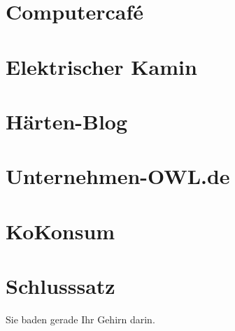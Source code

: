 \section{Computercafé}
\section{Elektrischer Kamin}
\section{Härten-Blog}
\section{Unternehmen-OWL.de}
\section{KoKonsum}


\section{Schlusssatz}
Sie baden gerade Ihr Gehirn darin.